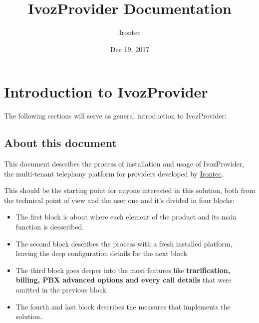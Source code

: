 \documentclass[letterpaper,10pt,english]{sphinxmanual}
\title{IvozProvider Documentation}
\date{Dec 19, 2017}
\author{Irontec}
\begin{document}
\maketitle
\tableofcontents
{}\label{index::doc}



\chapter{Introduction to IvozProvider}
\label{intro/index::doc}\label{intro/index:introduction-to-ivozprovider}\label{intro/index:ivozprovider-official-documentation}
The following sections will serve as general introduction to IvozProvider:


\section{About this document}
\label{intro/about:about-this-document}\label{intro/about::doc}
This document describes the process of installation and usage of
IvozProvider, the multi-tenant telephony platform for providers developed
by \href{http://irontec.com}{Irontec}.

This should be the starting point for anyone interested in this solution,
both  from the technical point of view and the user one and it's divided
in four blocks:
\begin{itemize}
\item {} 
The first block is about {\hyperref[index:concepts]{}} where each element of the
product and its main function is decscribed.

\item {} 
The second block describes the {\hyperref[index:installation]{}} process with a fresh
installed platform, leaving the deep configuration details for the next
block.

\item {} 
The third block goes deeper into the most {\hyperref[index:advanced]{}} features like
\textbf{trarification, billing, PBX advanced options and every call details}
that were omitted in the previous block.

\item {} 
The fourth and last block describes the {\hyperref[index:security]{}} measures that
implements the solution.

\end{itemize}
\end{document}
